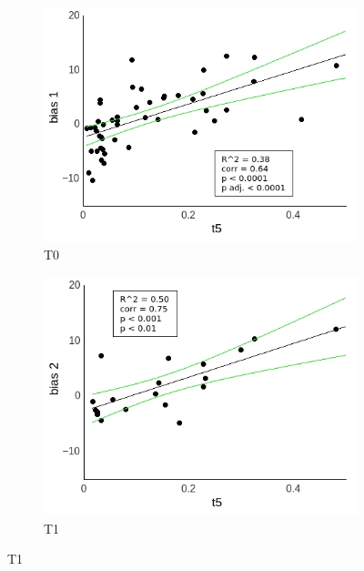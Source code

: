 \documentclass[a4paper]{scrreprt}
\begin{document}
\begin{figure}
\centering
\begin{subfigure}[b]{0.49\textwidth}
        \includegraphics[width=\textwidth]{figs/sec3/t5/t5no_diff_1_mod1dat.jpeg}
        \caption{T0}
    \end{subfigure}
    \begin{subfigure}[b]{0.49\textwidth}
        \includegraphics[width=\textwidth]{figs/sec3/t5/t5no_diff_2_mod1dat.jpeg}
        \caption{T1}
    \end{subfigure}


\end{figure}
\end{document}
